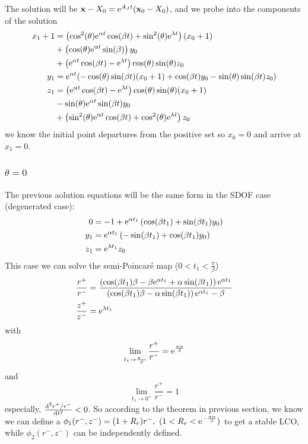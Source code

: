 \documentclass[a4paper,10pt]{article}
\begin{document}
	The solution will be $\mathbf{x}-X_0 = {\rm e}^{A_J t}(\mathbf{x}_0 - X_0)$, and we probe into the components of the solution 
	\begin{align}
	\nonumber
	x_1+1 &= \left(\cos^{2}(\theta) {\rm e}^{\alpha t} \cos (\beta t)+\sin^{2}(\theta) {\rm e}^{\lambda t} \right)(x_0+1) \\ \nonumber
	&+ \left(\cos(\theta) {\rm e}^{\alpha t} \sin(\beta ) \right) y_0 \\	
	&+ \left({\rm e}^{\alpha t} \cos(\beta t)-{\rm e}^{\lambda t} \right)\cos(\theta) \sin(\theta)  z_0
	\\  
	y_1 &={\rm e}^{\alpha t} (-\cos(\theta)  \sin(\beta t) (x_0 +1) + \cos (\beta t) y_0 -\sin(\theta)  \sin (\beta t) z_0)
	\\ \nonumber
	z_1 &= \left({\rm e}^{\alpha t} \cos(\beta t)-{\rm e}^{\lambda t} \right)\cos(\theta) \sin(\theta)  (x_0+1)\\ \nonumber
	& -\sin(\theta) {\rm e}^{\alpha t} \sin (\beta t) y_0 \\ 
	& + \left(\sin^{2}(\theta) {\rm e}^{\alpha t} \cos (\beta t)+\cos^{2}(\theta) {\rm e}^{\lambda t} \right) z_0  
	\end{align}
	we know the initial point departures from the positive set so $x_0 = 0$ and arrive at $x_1=0$. 
	\subsubsection{$\theta = 0$} 
	The previous aolution equations will be the same form in the SDOF case (degenerated case):
	\begin{align}
	0 &=-1+{\rm e}^{\alpha t_1} \left(  \cos (\beta t_1) +  \sin(\beta t_1)y_0  \right) 
	\\
	y_1 &=  {\rm e}^{\alpha t_1} \left( -\sin(\beta t_1)  + \cos (\beta t_1) y_0 \right)
	\\
	z_1 &= {\rm e}^{\lambda t_1} z_0
	\end{align}
	This case we can solve the semi-Poincar{\'e} map ($0<t_1<\frac{\pi}{\beta}$) 
	\begin{align}
	\frac{r^+}{r^-} & =\frac{\left(\cos(\beta t_1) \beta-\beta {\rm e}^{\alpha t_1}+\alpha \sin(\beta t_1)\right) {\rm e}^{\alpha t_1}}{\left(\cos(\beta t_1) \beta-\alpha \sin(\beta t_1)\right) {\rm e}^{\alpha t_1}-\beta} \\
	\frac{z^+}{z^-} &= {\rm e}^{\lambda t_1}
	\end{align}
	with 
	$$\lim_{t_1\rightarrow \frac{\pi^-}{\beta}} \frac{r^+}{r^-} = {\rm e}^{\frac{\pi \alpha}{\beta}}$$ and $$\lim_{t_1\rightarrow 0^+} \frac{r^+}{r^-} = 1$$
	especially, $\frac{{\rm d}^2 r^+ / r^-}{{\rm d} t^2}<0$.
	So according to the theorem in previous section, we know we can define a $\phi_1(r^-,z^-) = (1+R_r) r^-,~(1<R_r< {\rm e}^{-\frac{\pi \alpha}{\beta}})$ to get a stable LCO, while $\phi_2(r^-,z^-)$ can be independently defined.
	
\end{document}
